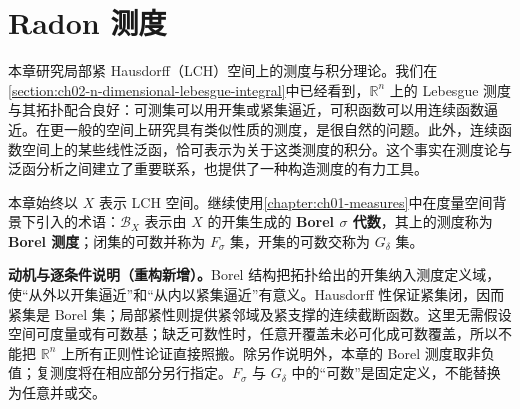 \documentclass[../main.tex]{subfiles}
\begin{document}
\chapter{Radon 测度}\label{chapter:ch07-radon-measures}

本章研究局部紧 Hausdorff（LCH）空间上的测度与积分理论。我们在\cref{section:ch02-n-dimensional-lebesgue-integral}中已经看到，$\mathbb R^n$ 上的 Lebesgue 测度与其拓扑配合良好：可测集可以用开集或紧集逼近，可积函数可以用连续函数逼近。在更一般的空间上研究具有类似性质的测度，是很自然的问题。此外，连续函数空间上的某些线性泛函，恰可表示为关于这类测度的积分。这个事实在测度论与泛函分析之间建立了重要联系，也提供了一种构造测度的有力工具。

\begin{definition}\label{definition:ch07-borel-conventions}
本章始终以 $X$ 表示 LCH 空间。继续使用\cref{chapter:ch01-measures}中在度量空间背景下引入的术语：$\mathscr B_X$ 表示由 $X$ 的开集生成的 \textbf{Borel $\sigma$ 代数}，其上的测度称为 \textbf{Borel 测度}；闭集的可数并称为 $F_\sigma$ 集，开集的可数交称为 $G_\delta$ 集。
\end{definition}
\begin{remark}
\textbf{动机与逐条件说明（重构新增）。}Borel 结构把拓扑给出的开集纳入测度定义域，使“从外以开集逼近”和“从内以紧集逼近”有意义。Hausdorff 性保证紧集闭，因而紧集是 Borel 集；局部紧性则提供紧邻域及紧支撑的连续截断函数。这里无需假设空间可度量或有可数基；缺乏可数性时，任意开覆盖未必可化成可数覆盖，所以不能把 $\mathbb R^n$ 上所有正则性论证直接照搬。除另作说明外，本章的 Borel 测度取非负值；复测度将在相应部分另行指定。$F_\sigma$ 与 $G_\delta$ 中的“可数”是固定定义，不能替换为任意并或交。
\end{remark}





\end{document}
